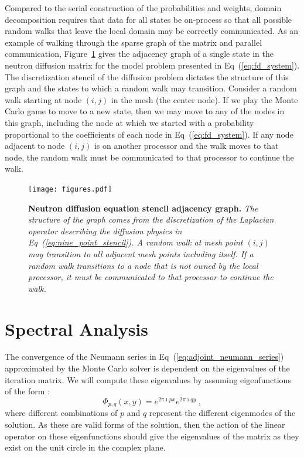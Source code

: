 \documentclass[preprint,11pt]{elsarticle}
\begin{document}
Compared to the serial construction of the probabilities and weights, domain
decomposition requires that data for all states be on-process so that all
possible random walks that leave the local domain may be correctly
communicated. As an example of walking through the sparse graph of the matrix
and parallel communication, Figure~\ref{fig:diffusion_graph} gives the
adjacency graph of a single state in the neutron diffusion matrix for the
model problem presented in Eq~(\ref{eq:fd_system}). The discretization stencil
of the diffusion problem dictates the structure of this graph and the states
to which a random walk may transition. Consider a random walk starting at node
$(i,j)$ in the mesh (the center node). If we play the Monte Carlo game to move
to a new state, then we may move to any of the nodes in this graph, including
the node at which we started with a probability proportional to the
coefficients of each node in Eq~(\ref{eq:fd_system}). If any node adjacent to
node $(i,j)$ is on another processor and the walk moves to that node, the
random walk must be communicated to that processor to continue the walk.

\begin{figure}[ht!]
  \centerline{ \texttt{[image: figures.pdf]} }
  \caption{\textbf{Neutron diffusion equation stencil adjacency graph.}
    \textit{The structure of the graph comes from the discretization of the
      Laplacian operator describing the diffusion physics in
      Eq~(\ref{eq:nine_point_stencil}). A random walk at mesh point $(i,j)$
      may transition to all adjacent mesh points including itself. If a
      random walk transitions to a node that is not owned by the local
      processor, it must be communicated to that processor to continue the
      walk.}}
  \label{fig:diffusion_graph}
\end{figure}

\section{Spectral Analysis}
\label{sec:spectral_analysis}

The convergence of the Neumann series in
Eq~(\ref{eq:adjoint_neumann_series}) approximated by the Monte Carlo
solver is dependent on the eigenvalues of the iteration matrix. We
will compute these eigenvalues by assuming eigenfunctions of the form
\cite{leveque_finite_2007}:
\begin{equation}
  \Phi_{p,q}(x,y) = e^{2 \pi \imath p x} e^{2 \pi \imath q y}\:,
  \label{eq:eigenfunction_form}
\end{equation}
where different combinations of $p$ and $q$ represent the different
eigenmodes of the solution. As these are valid forms of the solution,
then the action of the linear operator on these eigenfunctions should
give the eigenvalues of the matrix as they exist on the unit circle in
the complex plane.
\end{document}
